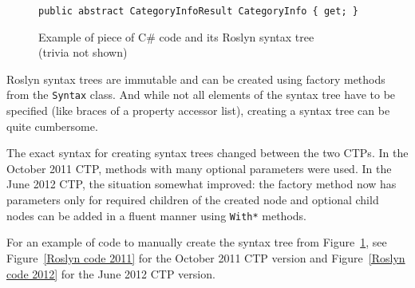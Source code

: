 \begin{figure}[htbp]

\begin{lstlisting}
public abstract CategoryInfoResult CategoryInfo { get; }
\end{lstlisting}

\begin{center}
\end{center}

\caption[Example of piece of C\# code and its Roslyn syntax tree]
{Example of piece of C\# code and its Roslyn syntax tree \\ (trivia not shown)}
\label{Syntax tree}
\end{figure}

\pagebreak[0]

Roslyn syntax trees are immutable and can be created using factory methods from the \lstinline{Syntax} class.
And while not all elements of the syntax tree have to be specified (like braces of a property accessor list),
creating a syntax tree can be quite cumbersome.

The exact syntax for creating syntax trees changed between the two CTPs.
In the October 2011 CTP, methods with many optional parameters were used.
In the June 2012 CTP, the situation somewhat improved:
the factory method now has parameters only for required children of the created node
and optional child nodes can be added in a fluent manner using \lstinline{With*} methods.

For an example of code to manually create the syntax tree from Figure~\ref{Syntax tree},
see Figure~\ref{Roslyn code 2011} for the October 2011 CTP version and
Figure~\ref{Roslyn code 2012} for the June 2012 CTP version.

